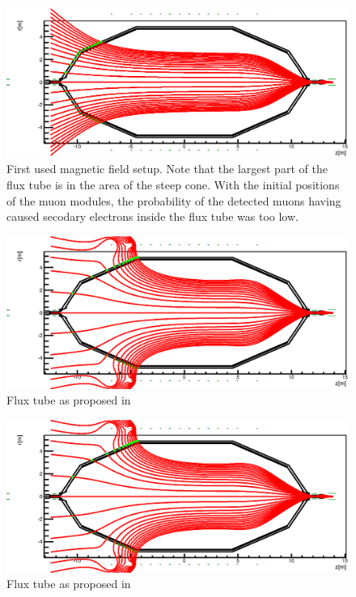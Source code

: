  
  \begin{figure}
  
	\centerline{\includegraphics[width = 1.45\textwidth]{graphics/analysis/mainSpec/fieldSimulation/fieldlines_100A.eps}}
	\caption[Flux tube setting A]{First used magnetic field setup. Note that the largest part of the flux tube is in the area of the steep cone. With the initial positions of the muon modules, the probability of the detected muons having caused secodary electrons inside the flux tube was too low.}
  	\label{fig:mainSpec_100A}
  \end{figure}


  \begin{figure}
	\centerline{\includegraphics[width = 1.45\textwidth]{graphics/analysis/mainSpec/fieldSimulation/fieldlines_B.eps}}
	\caption[Flux tube setting B]{Flux tube as proposed in \cite{proposalM12}}
  	\label{fig:mainSpec_B}
  \end{figure}

  
  \begin{figure}
	\centerline{\includegraphics[width = 1.45\textwidth]{graphics//analysis/mainSpec/fieldSimulation/fieldlines_9.eps}}
	\caption[Flux tube setting C]{Flux tube as proposed in \cite{proposalM12}}
  	\label{fig:mainSpec_9}
  \end{figure}

